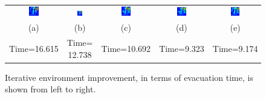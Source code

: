 \begin{figure}
	\begin{tabular}{c c c c c}
	\includegraphics[width=0.19\textwidth]{images/Hypothesis1/Iter1-User-17_t_16_615.png} & \includegraphics[width=0.19\textwidth]{images/Hypothesis1/Iter2-User-17_t_12_738.png} & \includegraphics[width=0.19\textwidth]{images/Hypothesis1/Iter3-User-17_t_10_692.png} & \includegraphics[width=0.19\textwidth]{images/Hypothesis1/Iter4-User-17_t_9_323.png} & \includegraphics[width=0.19\textwidth]{images/Hypothesis1/Iter5-User-17_t_9_174.png} \\
	(a) & (b) & (c) & (d) & (e)\\
	Time=16.615 & Time= 12.738 & Time=10.692 & Time=9.323 & Time=9.174
	\end{tabular}
	\caption{\label{fig:single-player-iterative-improvement}Iterative environment improvement, in terms of evacuation time, is shown from left to right.}
\end{figure}

